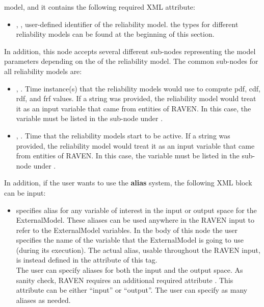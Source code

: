 \begin{itemize}
	model, and it contains the following required XML attribute:
	\begin{itemize}
		\item {}, , user-defined identifier of the reliability model.
		\nb the types for different reliability models can be found at the beginning of this section.
	\end{itemize}
	In addition, this node accepts several different sub-nodes representing the model parameters depending on the
	 of the reliability model. The common sub-nodes for all reliability models are:
	\begin{itemize}
		\item {}, . Time instance(s)
		that the reliability models would use to compute pdf, cdf, rdf, and frf values. If a string was provided,
		the reliability model would treat it as an input variable that came from entities of RAVEN. In this
		case, the variable must be listed in the sub-node  under .
		\item {}, . Time that the reliability models start to be active.
		If a string was provided, the reliability model would treat it as an input variable that came
		from entities of RAVEN. In this case, the variable must be listed in the sub-node 
		under .
	\end{itemize}
\end{itemize}
In addition, if the user wants to use the \textbf{alias} system, the following XML block can be input:
\begin{itemize}
	\item {}  specifies alias for
	any variable of interest in the input or output space for the ExternalModel.
	These aliases can be used anywhere in the RAVEN input to refer to the ExternalModel
	variables.
	In the body of this node the user specifies the name of the variable that the ExternalModel is
	going to use (during its execution).
	The actual alias, usable throughout the RAVEN input, is instead defined in the
	 attribute of this tag.
	\\The user can specify aliases for both the input and the output space. As sanity check, RAVEN
	requires an additional required attribute . This attribute can be either ``input'' or ``output''.
	\nb The user can specify as many aliases as needed.
\end{itemize}

